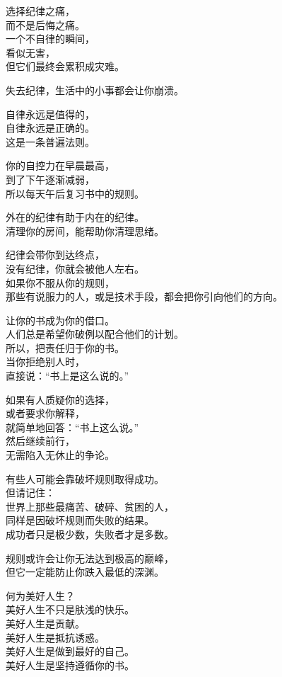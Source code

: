 \documentclass[
]{article}
\begin{document}
选择纪律之痛，\\
而不是后悔之痛。\\
一个不自律的瞬间，\\
看似无害，\\
但它们最终会累积成灾难。

失去纪律，生活中的小事都会让你崩溃。

自律永远是值得的，\\
自律永远是正确的。\\
这是一条普遍法则。

你的自控力在早晨最高，\\
到了下午逐渐减弱，\\
所以每天午后复习书中的规则。

外在的纪律有助于内在的纪律。\\
清理你的房间，能帮助你清理思绪。

纪律会带你到达终点，\\
没有纪律，你就会被他人左右。\\
如果你不服从你的规则，\\
那些有说服力的人，或是技术手段，都会把你引向他们的方向。

让你的书成为你的借口。\\
人们总是希望你破例以配合他们的计划。\\
所以，把责任归于你的书。\\
当你拒绝别人时，\\
直接说：``书上是这么说的。''

如果有人质疑你的选择，\\
或者要求你解释，\\
就简单地回答：``书上这么说。''\\
然后继续前行，\\
无需陷入无休止的争论。

有些人可能会靠破坏规则取得成功。\\
但请记住：\\
世界上那些最痛苦、破碎、贫困的人，\\
同样是因破坏规则而失败的结果。\\
成功者只是极少数，失败者才是多数。

规则或许会让你无法达到极高的巅峰，\\
但它一定能防止你跌入最低的深渊。

何为美好人生？\\
美好人生不只是肤浅的快乐。\\
美好人生是贡献。\\
美好人生是抵抗诱惑。\\
美好人生是做到最好的自己。\\
美好人生是坚持遵循你的书。
\end{document}
